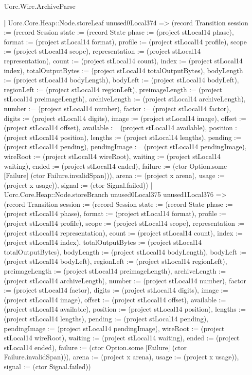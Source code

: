 \begin{lexlean}{Uorc.Wire.ArchiveParse}
\begin{semanticmodule}
{            | Uorc.Core.Heap::Node.storeLeaf unused0Local374 => (record Transition {session := (record Session {state := (record State {phase := (project stLocal14 phase), format := (project stLocal14 format), profile := (project stLocal14 profile), scope := (project stLocal14 scope), representation := (project stLocal14 representation), count := (project stLocal14 count), index := (project stLocal14 index), totalOutputBytes := (project stLocal14 totalOutputBytes), bodyLength := (project stLocal14 bodyLength), bodyLeft := (project stLocal14 bodyLeft), regionLeft := (project stLocal14 regionLeft), preimageLength := (project stLocal14 preimageLength), archiveLength := (project stLocal14 archiveLength), number := (project stLocal14 number), factor := (project stLocal14 factor), digits := (project stLocal14 digits), image := (project stLocal14 image), offset := (project stLocal14 offset), available := (project stLocal14 available), position := (project stLocal14 position), lengths := (project stLocal14 lengths), pending := (project stLocal14 pending), pendingImage := (project stLocal14 pendingImage), wireRoot := (project stLocal14 wireRoot), waiting := (project stLocal14 waiting), ended := (project stLocal14 ended), failure := (ctor Option.some [Failure] (ctor Failure.invalidSpan))}), arena := (project x arena), usage := (project x usage)}), signal := (ctor Signal.failed)})
            | Uorc.Core.Heap::Node.storeBranch unused0Local375 unused1Local376 => (record Transition {session := (record Session {state := (record State {phase := (project stLocal14 phase), format := (project stLocal14 format), profile := (project stLocal14 profile), scope := (project stLocal14 scope), representation := (project stLocal14 representation), count := (project stLocal14 count), index := (project stLocal14 index), totalOutputBytes := (project stLocal14 totalOutputBytes), bodyLength := (project stLocal14 bodyLength), bodyLeft := (project stLocal14 bodyLeft), regionLeft := (project stLocal14 regionLeft), preimageLength := (project stLocal14 preimageLength), archiveLength := (project stLocal14 archiveLength), number := (project stLocal14 number), factor := (project stLocal14 factor), digits := (project stLocal14 digits), image := (project stLocal14 image), offset := (project stLocal14 offset), available := (project stLocal14 available), position := (project stLocal14 position), lengths := (project stLocal14 lengths), pending := (project stLocal14 pending), pendingImage := (project stLocal14 pendingImage), wireRoot := (project stLocal14 wireRoot), waiting := (project stLocal14 waiting), ended := (project stLocal14 ended), failure := (ctor Option.some [Failure] (ctor Failure.invalidSpan))}), arena := (project x arena), usage := (project x usage)}), signal := (ctor Signal.failed)})
}
\end{semanticmodule}
\end{lexlean}
